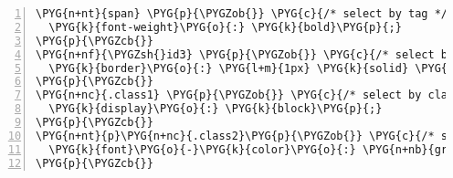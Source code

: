 \begin{Verbatim}[commandchars=\\\{\},numbers=left,stepnumber=1,codes={\catcode`\$=3\catcode`\^=7\catcode`\_=8}]
\PYG{n+nt}{span} \PYG{p}{\PYGZob{}} \PYG{c}{/* select by tag */}
  \PYG{k}{font-weight}\PYG{o}{:} \PYG{k}{bold}\PYG{p}{;}
\PYG{p}{\PYGZcb{}}
\PYG{n+nf}{\PYGZsh{}id3} \PYG{p}{\PYGZob{}} \PYG{c}{/* select by id */}
  \PYG{k}{border}\PYG{o}{:} \PYG{l+m}{1px} \PYG{k}{solid} \PYG{n+nb}{black}\PYG{p}{;}
\PYG{p}{\PYGZcb{}}
\PYG{n+nc}{.class1} \PYG{p}{\PYGZob{}} \PYG{c}{/* select by class */}
  \PYG{k}{display}\PYG{o}{:} \PYG{k}{block}\PYG{p}{;}
\PYG{p}{\PYGZcb{}}
\PYG{n+nt}{p}\PYG{n+nc}{.class2}\PYG{p}{\PYGZob{}} \PYG{c}{/* select element with 'p' tag AND class 'class2' */}
  \PYG{k}{font}\PYG{o}{-}\PYG{k}{color}\PYG{o}{:} \PYG{n+nb}{green}\PYG{p}{;}
\PYG{p}{\PYGZcb{}}
\end{Verbatim}
